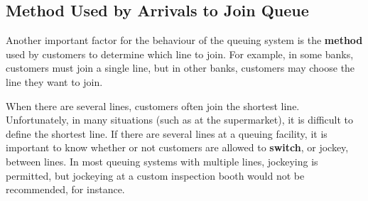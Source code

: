 \subsection{Method Used by Arrivals to Join Queue}
Another important factor for the behaviour of the queuing system is the \textbf{method} used by customers to determine which line to join. For example, in some banks, customers must join a single line, but in other banks, customers may choose the line they want to join. \par  When there are several lines, customers often join the shortest line. Unfortunately, in many situations (such as at the supermarket), it is difficult to define the shortest line. If there are several lines at a queuing facility, it is important to know whether or not customers are allowed to \textbf{switch}, or jockey, between lines. In most queuing systems with multiple lines, jockeying is permitted, but jockeying at a custom inspection booth would not be recommended, for instance. 

